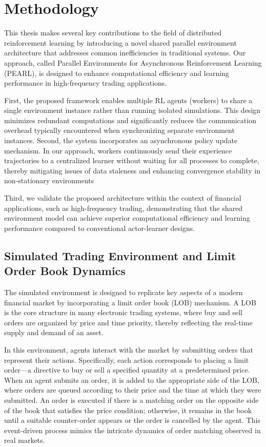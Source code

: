 \section{Methodology}
\label{sec:methodology}

This thesis makes several key contributions to the field of distributed reinforcement learning by introducing a novel shared
parallel environment architecture that addresses common inefficiencies in traditional systems.
Our approach, called Parallel Environments for Asynchronous Reinforcement Learning (PEARL),
is designed to enhance computational efficiency and learning performance in high-frequency trading applications.

First, the proposed framework enables multiple RL agents (workers) to share a single environment instance rather than running isolated simulations.
This design minimizes redundant computations and significantly reduces the communication overhead typically
encountered when synchronizing separate environment instances.
Second, the system incorporates an asynchronous policy update mechanism.
In our approach, workers continuously send their experience trajectories to a centralized learner without waiting for all processes to complete,
thereby mitigating issues of data staleness and enhancing convergence stability in non-stationary environments

Third, we validate the proposed architecture within the context of financial applications,
such as high-frequency trading, demonstrating that the shared environment
model can achieve superior computational efficiency and learning performance compared to conventional actor-learner designs.

\subsection{Simulated Trading Environment and Limit Order Book Dynamics}

The simulated environment is designed to replicate key aspects of a modern financial market by incorporating a limit order book (LOB) mechanism.
A LOB is the core structure in many electronic trading systems, where buy and sell orders are organized by price and time priority,
thereby reflecting the real-time supply and demand of an asset.

In this environment, agents interact with the market by submitting orders that represent their actions.
Specifically, each action corresponds to placing a limit order—a directive to buy or sell a specified quantity at a predetermined price.
When an agent submits an order, it is added to the appropriate side of the LOB, where orders are queued according to their price and
the time at which they were submitted.
An order is executed if there is a matching order on the opposite side of the book that satisfies the price condition;
otherwise, it remains in the book until a suitable counter-order appears or the order is cancelled by the agent.
This event-driven process mimics the intricate dynamics of order matching observed in real markets.

